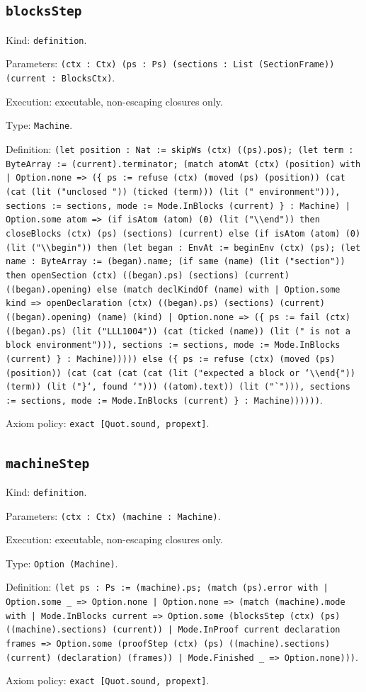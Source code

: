 \documentclass[11pt]{article}
\begin{document}
\subsection*{\texttt{blocksStep}}
\noindent Kind: \texttt{definition}.\par
\noindent Parameters: \texttt{(ctx : Ctx) (ps : Ps) (sections : List (SectionFrame)) (current : BlocksCtx)}.\par
\noindent Execution: executable, non-escaping closures only.\par
\noindent Type: \texttt{Machine}.\par
\noindent Definition: \texttt{(let position : Nat := skipWs (ctx) ((ps).pos); (let term : ByteArray := (current).terminator; (match atomAt (ctx) (position) with | Option.none => (\{ ps := refuse (ctx) (moved (ps) (position)) (cat (cat (lit ("unclosed ")) (ticked (term))) (lit (" environment"))), sections := sections, mode := Mode.InBlocks (current) \} : Machine) | Option.some atom => (if isAtom (atom) (0) (lit ("\textbackslash{}\textbackslash{}end")) then closeBlocks (ctx) (ps) (sections) (current) else (if isAtom (atom) (0) (lit ("\textbackslash{}\textbackslash{}begin")) then (let began : EnvAt := beginEnv (ctx) (ps); (let name : ByteArray := (began).name; (if same (name) (lit ("section")) then openSection (ctx) ((began).ps) (sections) (current) ((began).opening) else (match declKindOf (name) with | Option.some kind => openDeclaration (ctx) ((began).ps) (sections) (current) ((began).opening) (name) (kind) | Option.none => (\{ ps := fail (ctx) ((began).ps) (lit ("LLL1004")) (cat (ticked (name)) (lit (" is not a block environment"))), sections := sections, mode := Mode.InBlocks (current) \} : Machine))))) else (\{ ps := refuse (ctx) (moved (ps) (position)) (cat (cat (cat (cat (lit ("expected a block or `\textbackslash{}\textbackslash{}end\{")) (term)) (lit ("\}`, found `"))) ((atom).text)) (lit ("`"))), sections := sections, mode := Mode.InBlocks (current) \} : Machine))))))}.\par
\noindent Axiom policy: \texttt{exact [Quot.sound, propext]}.\par
\subsection*{\texttt{machineStep}}
\noindent Kind: \texttt{definition}.\par
\noindent Parameters: \texttt{(ctx : Ctx) (machine : Machine)}.\par
\noindent Execution: executable, non-escaping closures only.\par
\noindent Type: \texttt{Option (Machine)}.\par
\noindent Definition: \texttt{(let ps : Ps := (machine).ps; (match (ps).error with | Option.some \_ => Option.none | Option.none => (match (machine).mode with | Mode.InBlocks current => Option.some (blocksStep (ctx) (ps) ((machine).sections) (current)) | Mode.InProof current declaration frames => Option.some (proofStep (ctx) (ps) ((machine).sections) (current) (declaration) (frames)) | Mode.Finished \_ => Option.none)))}.\par
\noindent Axiom policy: \texttt{exact [Quot.sound, propext]}.\par
\end{document}

